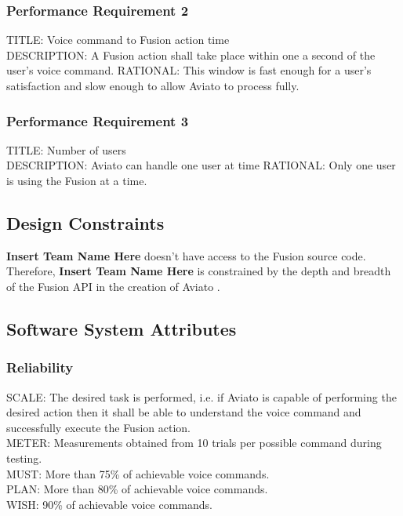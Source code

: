\documentclass[onecolumn, draftclsnofoot,10pt, compsoc]{IEEEtran}
\def \CapstoneTeamName{\textbf{Insert Team Name Here} }
\def \botname{Aviato }
\begin{document}
        \subsubsection{Performance Requirement 2}
        TITLE: Voice command to Fusion action time \\
        DESCRIPTION: A Fusion action shall take place within one a second of the user's voice command.
        RATIONAL: This window is fast enough for a user's satisfaction and slow enough to allow \botname to process fully.
        
        \subsubsection{Performance Requirement 3}
        TITLE: Number  of users \\
        DESCRIPTION: \botname can handle one user at time
        RATIONAL: Only one user is using the Fusion at a time. 
        
    \subsection{Design Constraints}
    	\CapstoneTeamName doesn't have access to the Fusion source code. Therefore, \CapstoneTeamName is constrained by the depth and breadth of the Fusion API in the creation of \botname.
        
    \subsection{Software System Attributes}
	   	\subsubsection{Reliability}
	   	SCALE: The desired task is performed, i.e. if \botname is capable of performing the desired action then it shall be able to understand the voice command and successfully execute the Fusion action.\\
	   	METER: Measurements obtained from 10 trials per possible command during testing.\\
	   	MUST: More than 75\% of achievable voice commands.\\
	   	PLAN: More than 80\% of achievable voice commands.\\
	   	WISH: 90\% of achievable voice commands.\\
   
		
\end{document}
